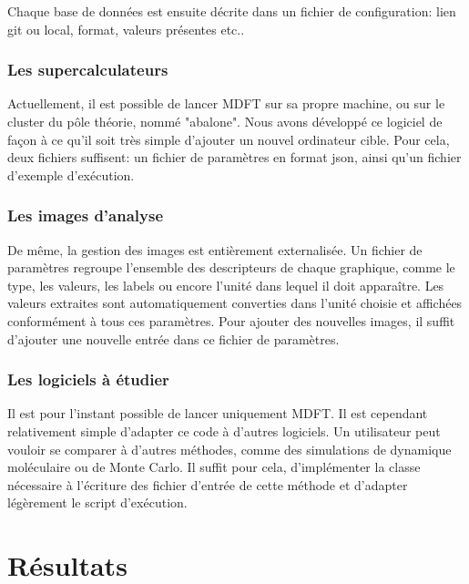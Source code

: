 Chaque base de données est ensuite décrite dans un fichier de configuration: lien git ou local, format, valeurs présentes etc..

\subsubsection{Les supercalculateurs}
Actuellement, il est possible de lancer MDFT sur sa propre machine, ou sur le cluster du pôle théorie, nommé "abalone". Nous avons développé ce logiciel de façon à ce qu'il soit très simple d'ajouter un nouvel ordinateur cible. Pour cela, deux fichiers suffisent: un fichier de paramètres en format json, ainsi qu'un fichier d'exemple d’exécution.

\subsubsection{Les images d'analyse}
De même, la gestion des images est entièrement externalisée. Un fichier de paramètres regroupe l'ensemble des descripteurs de chaque graphique, comme le type, les valeurs, les labels ou encore l'unité dans lequel il doit apparaître. Les valeurs extraites sont automatiquement converties dans l'unité choisie et affichées conformément à tous ces paramètres. Pour ajouter des nouvelles images, il suffit d'ajouter une nouvelle entrée dans ce fichier de paramètres.

\subsubsection{Les logiciels à étudier}
Il est pour l'instant possible de lancer uniquement MDFT. Il est cependant relativement simple d'adapter ce code à d'autres logiciels. Un utilisateur peut vouloir se comparer à d'autres méthodes, comme des simulations de dynamique moléculaire ou de Monte Carlo. Il suffit pour cela, d'implémenter la classe nécessaire à l'écriture des fichier d'entrée de cette méthode et d'adapter légèrement le script d’exécution.




\section{Résultats}
